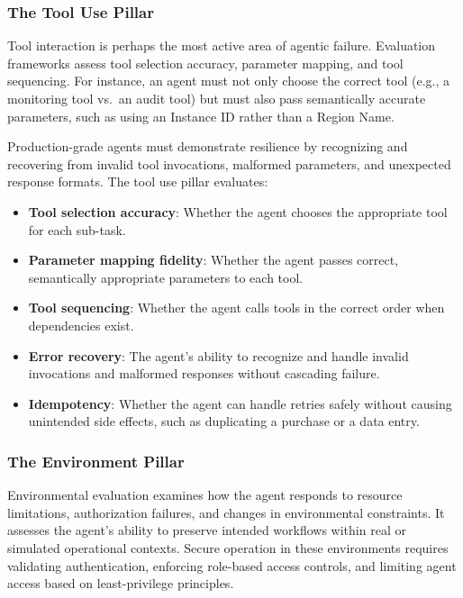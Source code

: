 \documentclass[11pt]{article}
\begin{document}
\subsubsection{The Tool Use Pillar}

Tool interaction is perhaps the most active area of agentic failure. Evaluation frameworks assess tool selection accuracy, parameter mapping, and tool sequencing. For instance, an agent must not only choose the correct tool (e.g., a monitoring tool vs.\ an audit tool) but must also pass semantically accurate parameters, such as using an Instance ID rather than a Region Name.

Production-grade agents must demonstrate resilience by recognizing and recovering from invalid tool invocations, malformed parameters, and unexpected response formats. The tool use pillar evaluates:
\begin{itemize}
    \item \textbf{Tool selection accuracy}: Whether the agent chooses the appropriate tool for each sub-task.
    \item \textbf{Parameter mapping fidelity}: Whether the agent passes correct, semantically appropriate parameters to each tool.
    \item \textbf{Tool sequencing}: Whether the agent calls tools in the correct order when dependencies exist.
    \item \textbf{Error recovery}: The agent's ability to recognize and handle invalid invocations and malformed responses without cascading failure.
    \item \textbf{Idempotency}: Whether the agent can handle retries safely without causing unintended side effects, such as duplicating a purchase or a data entry.
\end{itemize}

\subsubsection{The Environment Pillar}

Environmental evaluation examines how the agent responds to resource limitations, authorization failures, and changes in environmental constraints. It assesses the agent's ability to preserve intended workflows within real or simulated operational contexts. Secure operation in these environments requires validating authentication, enforcing role-based access controls, and limiting agent access based on least-privilege principles.
\end{document}

